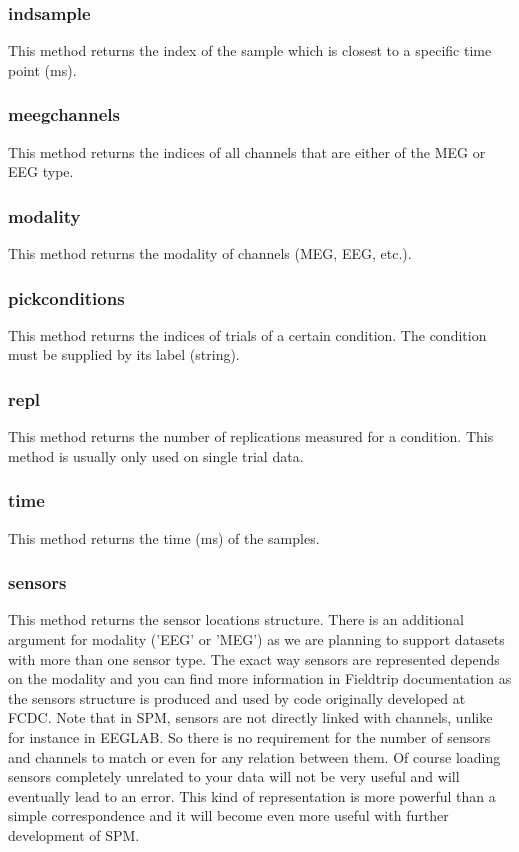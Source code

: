 \subsubsection{indsample}
This method returns the index of the sample which is closest to a specific time point (ms).

\subsubsection{meegchannels}
This method returns the indices of all channels that are either of the MEG or EEG type.

\subsubsection{modality}
This method returns the modality of channels (MEG, EEG, etc.).

\subsubsection{pickconditions}
This method returns the indices of trials of a certain condition. The condition must be supplied by its label (string).

\subsubsection{repl}
This method returns the number of replications measured for a condition. This method is usually only used on single trial data.

\subsubsection{time}
This method returns the time (ms) of the samples.

\subsubsection{sensors}
This method returns the sensor locations structure. There is an additional argument for modality ('EEG' or 'MEG') as we are planning to support datasets with more than one sensor type. The exact way sensors are represented depends on the modality and you can find more information in Fieldtrip documentation as the sensors structure is produced and used by code originally developed at FCDC. Note that in SPM, sensors are not directly linked with channels, unlike for instance in EEGLAB. So there is no requirement for the number of sensors and channels to match or even for any relation between them. Of course loading sensors completely unrelated to your data will not be very useful and will eventually lead to an error. This kind of representation is more powerful than a simple correspondence and it will become even more useful with further development of SPM.


